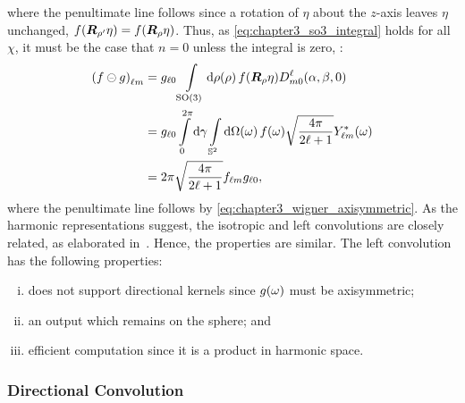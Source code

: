 %
where the penultimate line follows since a rotation of \({\eta}\) about the \(z\)-axis leaves \({\eta}\) unchanged, \ie{} \(f(\rotationMatrix[']\eta) = f(\rotationMatrix\eta)\).
Thus, as \cref{eq:chapter3_so3_integral} holds for all \(\chi{}\), it must be the case that \(n=0\) unless the integral is zero, \ie{}:
%
\begin{align}
	\harmonic{(f \circleddash g)}
	 & = \axiHarmonic{g} \integrateRotation{\rho} f(\rotationMatrix\eta) \wigner{\ell}{m}{0} (\alpha,\beta,0) \nonumber{}                                    \\
	 & = \axiHarmonic{g} \int\limits_{0}^{2\pi} \dd{\gamma} \integrateSphere{\omega} \pixel{f} \sqrt{\inverseFactor} \pixel{\conj{\harmonic{Y}}} \nonumber{} \\
	 & = 2\pi \sqrt{\inverseFactor} \harmonic{f} \axiHarmonic{g},
\end{align}
%
where the penultimate line follows by \cref{eq:chapter3_wigner_axisymmetric}.
As the harmonic representations suggest, the isotropic and left convolutions are closely related, as elaborated in~\cite{Kennedy2011}.
Hence, the properties are similar.
The left convolution has the following properties:
%
\begin{enumerate}[(i),nosep,left=\parindent]
	\item does not support directional kernels since \(\pixel{g}\) must be axisymmetric;
	\item an output which remains on the sphere; and
	\item efficient computation since it is a product in harmonic space.
\end{enumerate}

\subsubsection{Directional Convolution}


